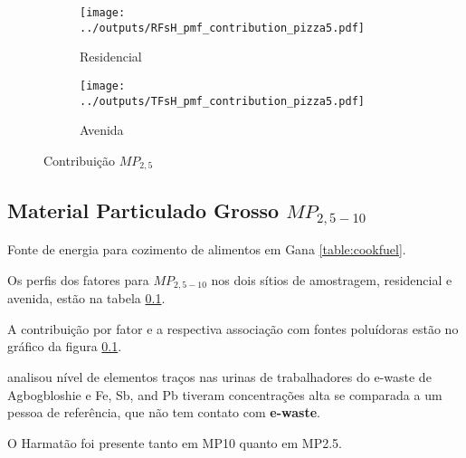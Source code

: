 \begin{figure}[H]
  \centering
  \begin{subfigure}[b]{0.45\textwidth}
    \texttt{[image: ../outputs/RFsH\_pmf\_contribution\_pizza5.pdf]}
    \caption{Residencial}
  \end{subfigure}%
  \begin{subfigure}[b]{0.45\textwidth}
    \texttt{[image: ../outputs/TFsH\_pmf\_contribution\_pizza5.pdf]}
    \caption{Avenida}
  \end{subfigure}
  \caption{Contribuição $MP_{2,5}$ \label{a:kkk}}
\end{figure}

\subsection{Material Particulado Grosso $MP_{2,5-10}$}

Fonte de energia para cozimento de alimentos em Gana \ref{table:cookfuel}.
\begin{table}[H]
 \centering
  
  \caption{Fontes de energia usadas para cozimento de alimentos em 
           Gana \citep{ghanacensus2013} \label{table:cookfuel}}
\end{table}

Os perfis dos fatores para $MP_{2,5-10}$ nos dois sítios de amostragem, 
residencial e avenida, estão na tabela \ref{}.

A contribuição por fator e a respectiva associação com fontes poluídoras
estão no gráfico da figura \ref{}. 

\citep{asante2012} analisou nível de elementos traços nas urinas de trabalhadores 
do e-waste de Agbogbloshie e Fe, Sb, and Pb tiveram concentrações alta se comparada
a um pessoa de referência, que não tem contato com \textbf{e-waste}.

O Harmatão foi presente tanto em MP10 quanto em MP2.5.

\begin{table}[H]
  
  \caption{Análise de Fatores para $MP_{2,5-10}$ na área residencial
           excluindo-se dias de ocorrência do Harmatão.
           Rotação varimax - 5 fatores retidos (n=).
           (\textcolor{red}{h} : Comunalidade; 
           \textcolor{red}{S=1-h} : Singularidade; 
           \textcolor{red}{C} : Complexidade.)
           \label{table:loadings_RGsH4}}
\end{table}

